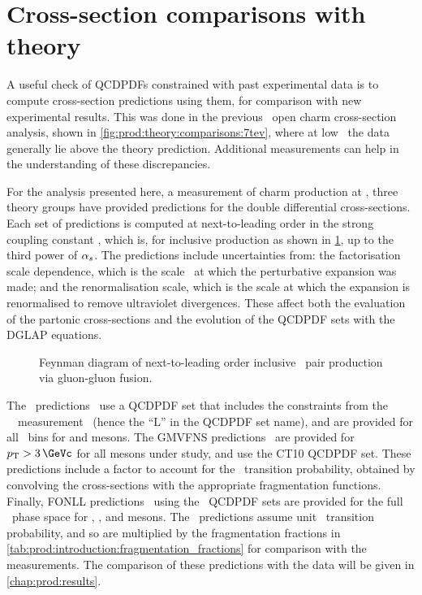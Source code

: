 \section{Cross-section comparisons with theory}
\label{chap:prod:theory:comparisons}

A useful check of \acp{QCDPDF} constrained with past experimental data is to 
compute cross-section predictions using them, for comparison with new 
experimental results.
This was done in the previous \lhcb\ open charm cross-section analysis, shown 
in \cref{fig:prod:theory:comparisons:7tev}, where at low \pT\ the data 
generally lie above the theory prediction.
Additional measurements can help in the understanding of these discrepancies.

For the analysis presented here, a measurement of charm production at 
, three theory groups have provided predictions for the double 
differential cross-sections.
Each set of predictions is computed at next-to-leading order in the strong 
coupling constant \alphas, which is, for inclusive production as shown in 
\cref{fig:prod:theory:qqbar_annihilation}, up to the third power of $\alpha_{s}$.
The predictions include uncertainties from: the factorisation scale dependence, 
which is the scale \pdfqsquared\ at which the perturbative expansion was made; 
and the renormalisation scale, which is the scale at which the expansion is 
renormalised to remove ultraviolet divergences.
These affect both the evaluation of the partonic cross-sections and the 
evolution of the \ac{QCDPDF} sets with the \ac{DGLAP} equations.

\begin{figure}
  \centering
  
  \caption{%
    Feynman diagram of next-to-leading order inclusive \qqbar\ pair production 
    via gluon-gluon fusion.
  }
  \label{fig:prod:theory:qqbar_annihilation}
\end{figure}

The \nnpdfl\ predictions~\cite{Gauld:2015yia} use a \ac{QCDPDF} set that 
includes the constraints from the \ \lhcb\ 
measurement~\cite{LHCb-PAPER-2012-041} (hence the ``L'' in the \ac{QCDPDF} set 
name), and are provided for all \pTy\ bins for \PDz and \PDp mesons.
The \ac{GMVFNS} predictions~\cite{Kniehl:2012ti} are provided for $\pT > 
\SI{3}{\GeVc}$ for all mesons under study, and use the CT10 \ac{QCDPDF} set.
These predictions include a factor to account for the \cToHc\ transition 
probability, obtained by convolving the \decay{\ccbar}{\PHc} cross-sections 
with the appropriate fragmentation functions.
Finally, \ac{FONLL} predictions~\cite{Cacciari:2015fta} using the \nnpdf\ 
\ac{QCDPDF} sets are provided for the full \pTy\ phase space for \PDz, \PDp, 
and \PDstarp mesons.
The \fonll\ predictions assume unit \cToHc\ transition probability, and so are 
multiplied by the fragmentation fractions in 
\cref{tab:prod:introduction:fragmentation_fractions} for comparison with the 
measurements.
The comparison of these predictions with the data will be given in 
\cref{chap:prod:results}.

